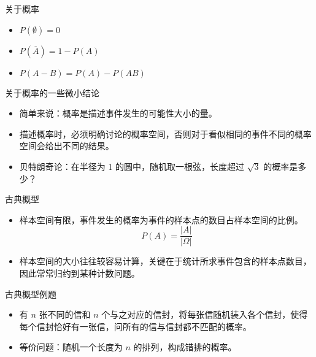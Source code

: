 \documentclass{beamer}
\begin{document}
    \begin{frame}{关于概率}
        \begin{itemize}
            \setlength{\itemsep}{10pt}
            \item $P(\emptyset)=0$
            \item $P(\overline{A})=1-P(A)$
            \item $P(A-B)=P(A)-P(AB)$
        \end{itemize}
    \end{frame}
    \begin{frame}{关于概率的一些微小结论}
        \begin{itemize}
            \setlength{\itemsep}{10pt}
            \item 简单来说：概率是描述事件发生的可能性大小的量。
            \item 描述概率时，必须明确讨论的概率空间，否则对于看似相同的事件不同的概率空间会给出不同的结果。
            \item 贝特朗奇论：在半径为 1 的圆中，随机取一根弦，长度超过 $\sqrt3$ 的概率是多少？
        \end{itemize}
    \end{frame}

    \begin{frame}{古典概型}
        \begin{itemize}
            \setlength{\itemsep}{10pt}
            \item 样本空间有限，事件发生的概率为事件的样本点的数目占样本空间的比例。
            $$P(A)=\frac{|A|}{|\Omega|}$$
            \item 样本空间的大小往往较容易计算，关键在于统计所求事件包含的样本点数目，因此常常归约到某种计数问题。
        \end{itemize}
    \end{frame}

    \begin{frame}{古典概型例题}
        \begin{itemize}
            \setlength{\itemsep}{10pt}
            \item 有 $n$ 张不同的信和 $n$ 个与之对应的信封，将每张信随机装入各个信封，使得每个信封恰好有一张信，问所有的信与信封都不匹配的概率。

            \item 等价问题：随机一个长度为 $n$ 的排列，构成错排的概率。
        \end{itemize}
    \end{frame}
\end{document}
